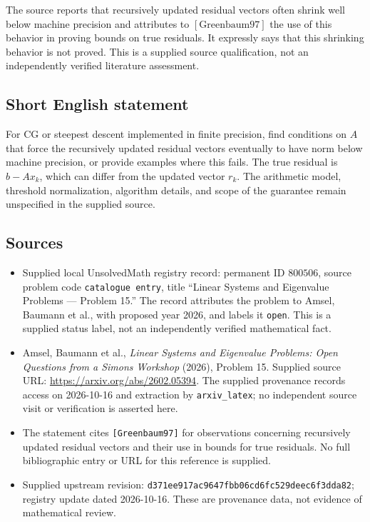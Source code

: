 \documentclass[11pt]{article}
\begin{document}
The source reports that recursively updated residual vectors often shrink well below machine precision and attributes to \([\mathrm{Greenbaum97}]\) the use of this behavior in proving bounds on true residuals. It expressly says that this shrinking behavior is not proved. This is a supplied source qualification, not an independently verified literature assessment.
\subsection{Short English statement}
For CG or steepest descent implemented in finite precision, find conditions on \(A\) that force the recursively updated residual vectors eventually to have norm below machine precision, or provide examples where this fails. The true residual is \(b-Ax_k\), which can differ from the updated vector \(r_k\). The arithmetic model, threshold normalization, algorithm details, and scope of the guarantee remain unspecified in the supplied source.
\subsection{Sources}
\begin{itemize}
\item Supplied local UnsolvedMath registry record: permanent ID \(800506\), source problem code \texttt{catalogue entry}, title ``Linear Systems and Eigenvalue Problems --- Problem 15.'' The record attributes the problem to Amsel, Baumann et al., with proposed year 2026, and labels it \texttt{open}. This is a supplied status label, not an independently verified mathematical fact.
\item Amsel, Baumann et al., \emph{Linear Systems and Eigenvalue Problems: Open Questions from a Simons Workshop} (2026), Problem 15. Supplied source URL: \url{https://arxiv.org/abs/2602.05394}. The supplied provenance records access on 2026-10-16 and extraction by \texttt{arxiv\_latex}; no independent source visit or verification is asserted here.
\item The statement cites \texttt{[Greenbaum97]} for observations concerning recursively updated residual vectors and their use in bounds for true residuals. No full bibliographic entry or URL for this reference is supplied.
\item Supplied upstream revision: \texttt{d371ee917ac9647fbb06cd6fc529deec6f3dda82}; registry update dated 2026-10-16. These are provenance data, not evidence of mathematical review.
\end{itemize}
\end{document}
